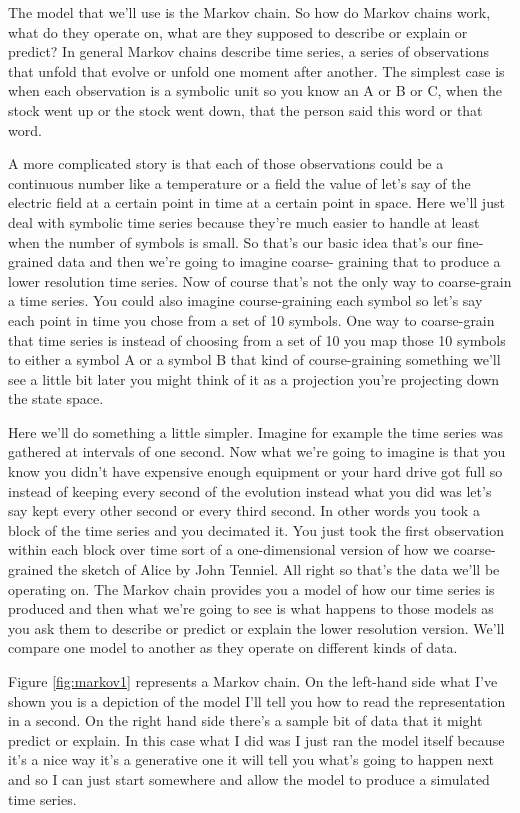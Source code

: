\documentclass[]{article}
\begin{document}
The model that we'll use is the Markov
chain. So how do Markov chains work, what
do they operate on, what are they
supposed to describe or explain or
predict? In general Markov chains
describe time series, a series of
observations that unfold that
evolve or unfold one moment after
another. The simplest case is when each
observation is a symbolic unit so you
know an A or B or C, when the stock
went up or the stock went down, that the
person said this word or that word.

A more complicated story is that each of
those observations could be a continuous
number like a temperature or a field the
value of let's say of the electric field
at a certain point in time at a certain
point in space. Here we'll just deal with
symbolic time series because they're
much easier to handle at least when the
number of symbols is small. So that's our
basic idea that's our fine-grained data
and then we're going to imagine coarse-
graining that to produce a lower
resolution time series. Now of course
that's not the only way to coarse-grain
a time series. You could also imagine
course-graining each symbol so let's say
each point in time you chose from a set
of 10 symbols. One way to coarse-grain
that time series is instead of choosing
from a set of 10 you map those 10
symbols to either a symbol A or a symbol
B that kind of course-graining something
we'll see a little bit later you might
think of it as a projection you're
projecting down the state space.

Here we'll do something a little simpler.
Imagine for example the time series was
gathered at intervals of one second.
Now what we're going to imagine is that
you know you didn't have expensive
enough equipment or your hard drive got
full so instead of keeping every second
of the evolution instead what you did
was let's say kept every other second or
every third second. In other words you
took a block of the time series and you
decimated it. You just took the first
observation within each block over time
sort of a one-dimensional version of how
we coarse-grained the sketch of Alice by
John Tenniel. All right so that's the
data we'll be operating on. The Markov
chain provides you a model of how our
time series is produced and then what
we're going to see is what happens to
those models as you ask them to describe
or predict or explain
the lower resolution version. We'll
compare one model to another as they
operate on different kinds of data.

Figure \ref{fig:markov1} represents a Markov chain. On the left-hand
side what I've shown you is a depiction of the model I'll tell you how to read
the representation in a second. On the right hand side there's a sample bit of
data that it might predict or explain. In this case what I did was I just ran the
model itself because it's a nice way it's a generative one it will tell you what's
going to happen next and so I can just start somewhere and allow the model to
produce a simulated time series.
\end{document}
